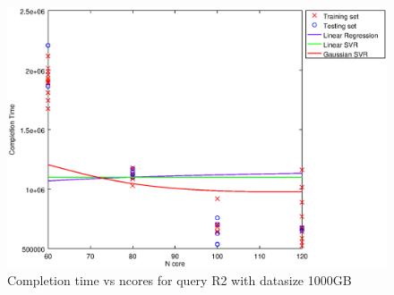 
\begin {figure}[hbtp]
\centering
\includegraphics[width=\textwidth]{output/R2_1000_1_OVER_NCORES/plot_R2_1000_bestmodels.eps}
\caption{Completion time vs ncores for query R2 with datasize 1000GB}
\label{fig:all_nonlinear_R2_1000}
\end {figure}
